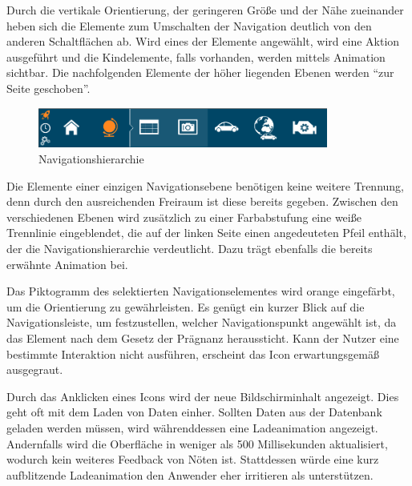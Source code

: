 Durch die vertikale Orientierung, der geringeren Größe und der Nähe zueinander heben sich die Elemente zum Umschalten der Navigation deutlich von den anderen Schaltflächen ab. Wird eines der Elemente angewählt, wird eine Aktion ausgeführt und die Kindelemente, falls vorhanden, werden mittels Animation sichtbar. Die nachfolgenden Elemente der höher liegenden Ebenen werden \enquote{zur Seite geschoben}.\par
\begin{figure}[H]
 \centering
 \includegraphics[width=0.85\textwidth]{grafiken/navi.png}
 \caption{Navigationshierarchie}
 \label{fig:navi}
\end{figure}
Die Elemente einer einzigen Navigationsebene benötigen keine weitere Trennung, denn durch den ausreichenden Freiraum ist diese bereits gegeben. Zwischen den verschiedenen Ebenen wird zusätzlich zu einer Farbabstufung eine weiße Trennlinie eingeblendet, die auf der linken Seite einen angedeuteten Pfeil enthält, der die Navigationshierarchie verdeutlicht. Dazu trägt ebenfalls die bereits erwähnte Animation bei.\par
Das Piktogramm des selektierten Navigationselementes wird orange eingefärbt, um die Orientierung zu gewährleisten. Es genügt ein kurzer Blick auf die Navigationsleiste, um festzustellen, welcher Navigationspunkt angewählt ist, da das Element nach dem Gesetz der Prägnanz heraussticht. Kann der Nutzer eine bestimmte Interaktion nicht ausführen, erscheint das Icon erwartungsgemäß ausgegraut.\par
Durch das Anklicken eines Icons wird der neue Bildschirminhalt angezeigt. Dies geht oft mit dem Laden von Daten einher. Sollten Daten aus der Datenbank geladen werden müssen, wird währenddessen eine Ladeanimation angezeigt. Andernfalls wird die Oberfläche in weniger als 500 Millisekunden aktualisiert, wodurch kein weiteres Feedback von Nöten ist. Stattdessen würde eine kurz aufblitzende Ladeanimation den Anwender eher irritieren als unterstützen.\par
